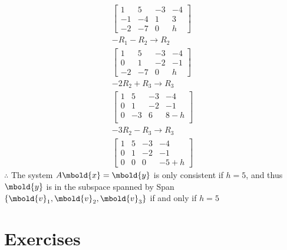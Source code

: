 \documentclass[12pt letter]{report}
\begin{document}
{{    \begin{align*}
      \begin{bmatrix}
        1  & 5  & -3 & -4 \\
        -1 & -4 & 1  & 3  \\
        -2 & -7 & 0  & h
      \end{bmatrix}    \\
      -R_1 - R_2 \to R_2   \\
      \begin{bmatrix}
        1  & 5  & -3 & -4 \\
        0  & 1  & -2 & -1 \\
        -2 & -7 & 0  & h
      \end{bmatrix}    \\
      -2 R_2 + R_3 \to R_3 \\
      \begin{bmatrix}
        1 & 5  & -3 & -4    \\
        0 & 1  & -2 & -1    \\
        0 & -3 & 6  & 8 - h \\
      \end{bmatrix}  \\
      -3R_2 - R_3 \to R_3  \\
      \begin{bmatrix}
        1 & 5 & -3 & -4     \\
        0 & 1 & -2 & -1     \\
        0 & 0 & 0  & -5 + h
      \end{bmatrix}
    \end{align*}
    $\therefore$ The system $A \mbold{x} = \mbold{y}$ is only consistent if $h = 5$, and thus $\mbold{y}$ is in the
    subspace spanned by Span$\{\mbold{v}_1, \mbold{v}_2, \mbold{v}_3\} $ if and only if $h = 5$
  }
}

\section{Exercises}

\end{document}
